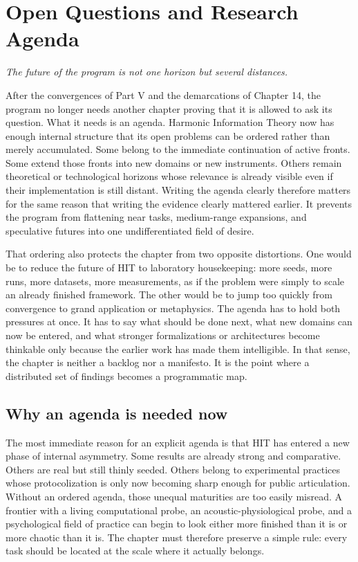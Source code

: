 \chapter{Open Questions and Research Agenda}

\epigraph{\emph{The future of the program is not one horizon but several distances.}}{}

After the convergences of Part V and the demarcations of Chapter 14, the program no longer needs another chapter proving that it is allowed to ask its question. What it needs is an agenda. Harmonic Information Theory now has enough internal structure that its open problems can be ordered rather than merely accumulated. Some belong to the immediate continuation of active fronts. Some extend those fronts into new domains or new instruments. Others remain theoretical or technological horizons whose relevance is already visible even if their implementation is still distant. Writing the agenda clearly therefore matters for the same reason that writing the evidence clearly mattered earlier. It prevents the program from flattening near tasks, medium-range expansions, and speculative futures into one undifferentiated field of desire.

That ordering also protects the chapter from two opposite distortions. One would be to reduce the future of HIT to laboratory housekeeping: more seeds, more runs, more datasets, more measurements, as if the problem were simply to scale an already finished framework. The other would be to jump too quickly from convergence to grand application or metaphysics. The agenda has to hold both pressures at once. It has to say what should be done next, what new domains can now be entered, and what stronger formalizations or architectures become thinkable only because the earlier work has made them intelligible. In that sense, the chapter is neither a backlog nor a manifesto. It is the point where a distributed set of findings becomes a programmatic map.


\section{Why an agenda is needed now}


The most immediate reason for an explicit agenda is that HIT has entered a new phase of internal asymmetry. Some results are already strong and comparative. Others are real but still thinly seeded. Others belong to experimental practices whose protocolization is only now becoming sharp enough for public articulation. Without an ordered agenda, those unequal maturities are too easily misread. A frontier with a living computational probe, an acoustic-physiological probe, and a psychological field of practice can begin to look either more finished than it is or more chaotic than it is. The chapter must therefore preserve a simple rule: every task should be located at the scale where it actually belongs.

